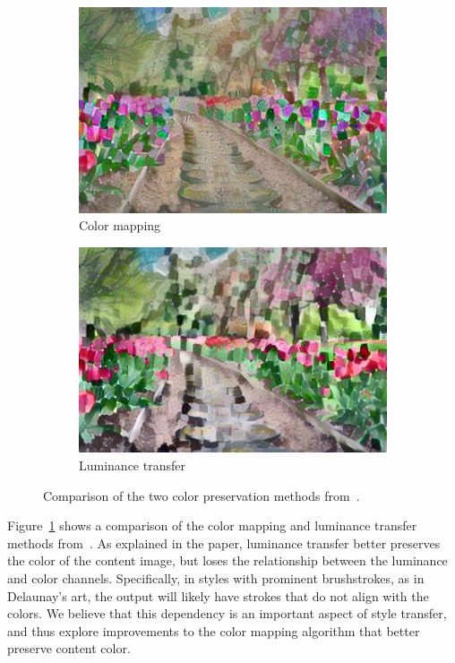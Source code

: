 \documentclass[10pt,twocolumn,letterpaper]{article}
\begin{document}
\begin{figure}[ht]
\centering
\begin{subfigure}[b]{0.49\linewidth}
  \centering
  \includegraphics[width=\linewidth]{imgs/flowers-rgb-eig.jpg}
  \caption{Color mapping}
\end{subfigure}
\begin{subfigure}[b]{0.49\linewidth}
  \centering
  \includegraphics[width=\linewidth]{imgs/flowers-luminance.jpg}
  \caption{Luminance transfer}
\end{subfigure}
\caption{Comparison of the two color preservation methods from~\cite{gatys-color}.}
\label{fig:color-orig}
\end{figure}

Figure~\ref{fig:color-orig} shows a comparison of the color mapping and luminance transfer methods from~\cite{gatys-color}. As explained in the paper, luminance transfer better preserves the color of the content image, but loses the relationship between the luminance and color channels. Specifically, in styles with prominent brushstrokes, as in Delaunay's art, the output will likely have strokes that do not align with the colors. We believe that this dependency is an important aspect of style transfer, and thus explore improvements to the color mapping algorithm that better preserve content color.
\end{document}
